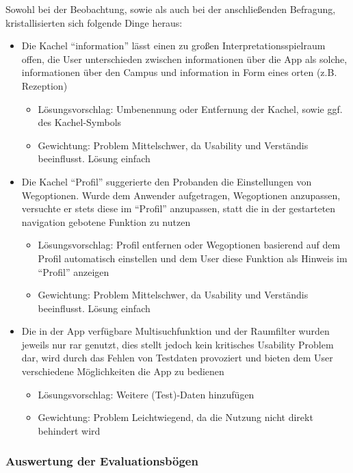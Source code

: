Sowohl bei der Beobachtung, sowie als auch bei der anschließenden Befragung, kristallisierten sich folgende Dinge heraus:
\begin{itemize}
    \item Die Kachel “\gls{information}” lässt einen zu großen Interpretationsspielraum offen, die User unterschieden zwischen \gls{information}en über die App als solche, \gls{information}en über den Campus und \gls{information} in Form eines \gls{ort}en (z.B. Rezeption)
    \begin{itemize}
        \item Lösungsvorschlag: Umbenennung oder Entfernung der Kachel, sowie ggf. des Kachel-Symbols
        \item Gewichtung: Problem Mittelschwer, da Usability und Verständis beeinflusst. Lösung einfach
    \end{itemize}
    \item Die Kachel “Profil” suggerierte den Probanden die Einstellungen von Wegoptionen. Wurde dem Anwender aufgetragen, Wegoptionen anzupassen, versuchte er stets diese im “Profil” anzupassen, statt die in der gestarteten \gls{navigation} gebotene Funktion zu nutzen
    \begin{itemize}
        \item Lösungsvorschlag: Profil entfernen oder Wegoptionen basierend auf dem Profil automatisch einstellen und dem User diese Funktion als Hinweis im “Profil” anzeigen
        \item Gewichtung: Problem Mittelschwer, da Usability und Verständis beeinflusst. Lösung einfach
    \end{itemize}
    \item Die in der App verfügbare Multisuchfunktion und der Raumfilter wurden jeweils nur rar genutzt, dies stellt jedoch kein kritisches Usability Problem dar, wird durch das Fehlen von Testdaten provoziert und bieten dem User verschiedene Möglichkeiten die App zu bedienen
    \begin{itemize}
        \item Lösungsvorschlag: Weitere (Test)-Daten hinzufügen
        \item Gewichtung: Problem Leichtwiegend, da die Nutzung nicht direkt behindert wird
    \end{itemize}
\end{itemize}

\subsubsection*{Auswertung der Evaluationsbögen}


